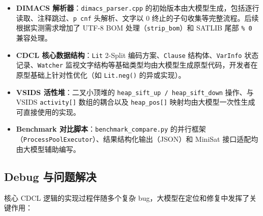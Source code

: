 \documentclass[12pt,a4paper]{article}
\begin{document}
\begin{itemize}[label=$\bullet$]
    \item \textbf{DIMACS 解析器}：\texttt{dimacs\_parser.cpp} 的初始版本由大模型生成，包括逐行读取、注释跳过、\texttt{p cnf} 头解析、文字以 0 终止的子句收集等完整流程。后续根据实测需求增加了 UTF-8 BOM 处理（\texttt{strip\_bom}）和 SATLIB 尾部 \texttt{\% 0} 兼容处理。
    \item \textbf{CDCL 核心数据结构}：\texttt{Lit} 2-Split 编码方案、\texttt{Clause} 结构体、\texttt{VarInfo} 状态记录、\texttt{Watcher} 监视文字结构等基础类型均由大模型生成原型代码，开发者在原型基础上针对性优化（如 \texttt{Lit.neg()} 的异或实现）。
    \item \textbf{VSIDS 活性堆}：二叉小顶堆的 \texttt{heap\_sift\_up / heap\_sift\_down} 操作、与 VSIDS \texttt{activity[]} 数组的耦合以及 \texttt{heap\_pos[]} 映射均由大模型一次性生成可直接使用的实现。
    \item \textbf{Benchmark 对比脚本}：\texttt{benchmark\_compare.py} 的并行框架（\texttt{ProcessPoolExecutor}）、结果结构化输出（JSON）和 MiniSat 接口适配均由大模型辅助编写。
\end{itemize}

\subsection{Debug 与问题解决}

核心 CDCL 逻辑的实现过程伴随多个复杂 bug，大模型在定位和修复中发挥了关键作用：
\end{document}
